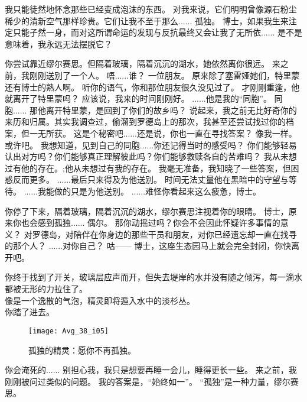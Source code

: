 \documentclass[openany]{book}
\begin{document}
\begin{dialogue}
     我只能徒然地怀念那些已经变成泡沫的东西。
     对我来说，它们明明曾像源石粉尘稀少的清新空气那样珍贵。它们让我不至于那么......
     孤独。
     博士，如果我生来注定只能孑然一身，而对这所谓命运的发现与反抗最终又会让我了无所依......
     是不是意味着，我永远无法摆脱它？\par
    你尝试靠近缪尔赛思。但隔着玻璃，隔着沉沉的湖水，她依然离你很远。
     来之前，我刚刚送别了一个人。
     唔......谁？
     一位朋友。
     原来除了塞雷娅她们，特里蒙还有博士的熟人啊。
     听你的语气，你和那位朋友很久没见过了。
     才刚刚重逢，他就离开了特里蒙吗？
     应该说，我来的时间刚刚好。
     ......他是我的“同胞”。
     同胞......
     那他离开特里蒙，是回到了你们的故乡吗？
     说起来，我之前无比好奇你的来历和归属。其实我调查过，偷溜到罗德岛上的那次，我甚至还尝试找过你的档案，但一无所获。
     这是个秘密吧......还是说，你也一直在寻找答案？
     像我一样。
     或许吧。
     我想知道，见到自己的同胞......你还记得当时的感受吗？
     你们能够轻易认出对方吗？你们能够真正理解彼此吗？你们能够救赎各自的苦难吗？
     我从未想过有他的存在。;他从未想过有我的存在。
     我毫无准备，我知晓了一些答案，但困惑反而更多。
     ......最后只来得及为他送别。
     时间无法丈量他在黑暗中的守望与等待。
     ......我能做的只是为他送别。
     ......难怪你看起来这么疲惫，博士。\par
    你停了下来，隔着玻璃，隔着沉沉的湖水，缪尔赛思注视着你的眼睛。
     博士，原来你也会感到孤独......
     偶尔。
     那你动摇过吗？你会不会因此怀疑许多事情的意义？
     对罗德岛，对陪伴在你身边的那些干员和朋友，对你已经遗忘却一直在找寻的那个人？
     ......对你自己？
     咕——
     博士，这座生态园马上就会完全封闭，你快离开吧。\par
    你终于找到了开关，玻璃层应声而开，但失去堤岸的水并没有随之倾泻，每一滴水都被无形的力拉住了。\\
    像是一个逸散的气泡，精灵即将遁入水中的淡杉丛。\\
    你踏了进去。
    \begin{figure}[h]
        \caption*{孤独的精灵：愿你不再孤独。}
        \centering
        \texttt{[image: Avg\_38\_i05]}
    \end{figure}
     你会淹死的......
     别担心我，我只是想要再睡一会儿，睡得更长一些。
     来之前，我刚刚被问过类似的问题。
     我的答案是，“始终如一”。
     “孤独”是一种力量，缪尔赛思。
\end{dialogue}
\end{document}
